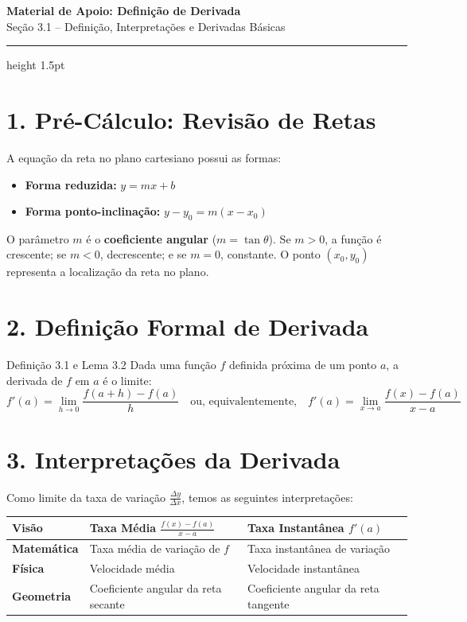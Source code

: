 \documentclass[12pt,a4paper]{article}
\begin{document}
\begin{center}
  \vspace*{-0.3cm}
  {\LARGE\bfseries\color{primary} Material de Apoio: Definição de Derivada} \\[0.2cm]
  {\small\sffamily\color{gray} Seção 3.1 -- Definição, Interpretações e Derivadas Básicas}
  \vspace*{0.3cm}
  {\color{primary}\hrule height 1.5pt}
\end{center}

\vspace{0.3cm}

\section*{1. Pré-Cálculo: Revisão de Retas}
A equação da reta no plano cartesiano possui as formas:
\begin{itemize}
  \item \textbf{Forma reduzida:} $y = mx + b$
  \item \textbf{Forma ponto-inclinação:} $y - y_0 = m(x - x_0)$
\end{itemize}
O parâmetro $m$ é o \textbf{coeficiente angular} ($m = \tan \theta$). Se $m > 0$, a função é crescente; se $m < 0$, decrescente; e se $m = 0$, constante. O ponto $(x_0, y_0)$ representa a localização da reta no plano.

\section*{2. Definição Formal de Derivada}
\begin{definicao}{Definição 3.1 e Lema 3.2}
Dada uma função $f$ definida próxima de um ponto $a$, a derivada de $f$ em $a$ é o limite:
\[
  f'(a) = \lim_{h \to 0} \frac{f(a+h) - f(a)}{h} \quad \text{ou, equivalentemente,} \quad f'(a) = \lim_{x \to a} \frac{f(x) - f(a)}{x - a}
\]
\end{definicao}

\section*{3. Interpretações da Derivada}
Como limite da taxa de variação $\frac{\Delta y}{\Delta x}$, temos as seguintes interpretações:
\begin{table}[h!]
  \centering
  \begin{tabular}{l p{6cm} p{6cm}}
    \toprule
    \textbf{Visão} & \textbf{Taxa Média} $\frac{f(x)-f(a)}{x-a}$ & \textbf{Taxa Instantânea} $f'(a)$ \\
    \midrule
    \textbf{Matemática} & Taxa média de variação de $f$ & Taxa instantânea de variação \\
    \textbf{Física} & Velocidade média & Velocidade instantânea \\
    \textbf{Geometria} & Coeficiente angular da reta secante & Coeficiente angular da reta tangente \\
    \bottomrule
  \end{tabular}
\end{table}
\end{document}
